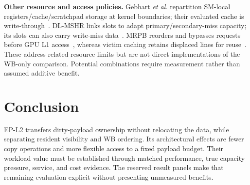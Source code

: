 \documentclass[conference,letterpaper]{IEEEtran}
\newcommand{\epl}{EP-L2}
\begin{document}
\textbf{Other resource and access policies.} Gebhart \emph{et al.} repartition SM-local registers/cache/scratchpad storage at kernel boundaries; their evaluated cache is write-through~\cite{unified}. DL-MSHR links slots to adapt primary/secondary-miss capacity; its slots can also carry write-miss data~\cite{dlmshr}. MRPB reorders and bypasses requests before GPU L1 access~\cite{mrpb}, whereas victim caching retains displaced lines for reuse~\cite{victim}. These address related resource limits but are not direct implementations of the WB-only comparison. Potential combinations require measurement rather than assumed additive benefit.

\section{Conclusion}
\epl{} transfers dirty-payload ownership without relocating the data, while separating resident visibility and WB ordering. Its architectural effects are fewer copy operations and more flexible access to a fixed payload budget. Their workload value must be established through matched performance, true capacity pressure, service, and cost evidence. The reserved result panels make that remaining evaluation explicit without presenting unmeasured benefits.
\end{document}
